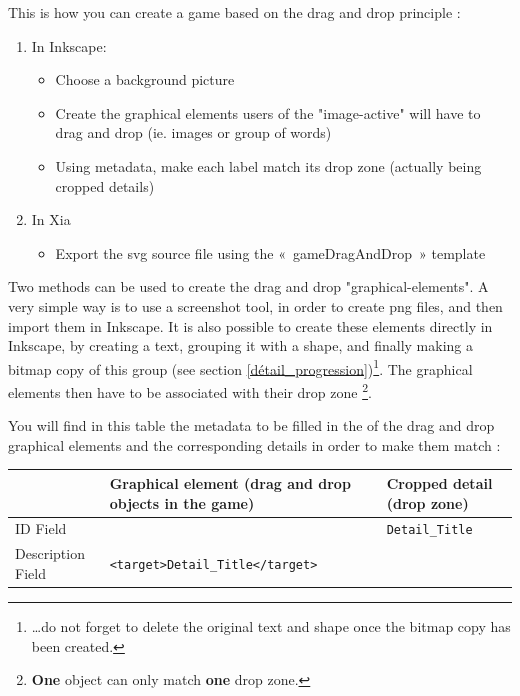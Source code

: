 
This is how you can create a game based on the drag and drop principle :
\begin{enumerate}
 \item In Inkscape:
\begin{itemize}
 \item Choose a background picture
 \item Create the graphical elements users of the "image-active" will have to drag and drop (ie. images or group of words)
 \item Using metadata, make each label match its drop zone (actually being cropped details)
\end{itemize}
 \item In Xia
 \begin{itemize}
  \item Export the svg source file using the «~gameDragAndDrop~» template
 \end{itemize}
\end{enumerate}

Two methods can be used to create the drag and drop "graphical-elements".
A very simple way is to use a screenshot tool, in order to create png files, and then import them in Inkscape.
It is also possible to create these elements directly in Inkscape, by creating a text, grouping it with a shape,
and finally making a bitmap copy of this group 
(see section \ref{détail_progression})\footnote{\ldots do not forget to delete
the original text and shape once the bitmap copy has been created.}.
The graphical elements then have to be associated with their drop zone \footnote{\textbf{One} object can only match \textbf{one} drop zone.}.

You will find in this table the metadata to be filled in the  
of the drag and drop graphical elements and the corresponding details in order to make them match :

\begin{center}
\begin{tabular}{|p{}|p{2.5in}|p{1.5in}|}
\hline
 & Graphical element (drag and drop objects in the game) & Cropped detail (drop zone)\\
\hline
ID Field & & \verb|Detail_Title|\\
\hline
Description Field & \verb|<target>Detail_Title</target>| & \\
\hline
\end{tabular}
\end{center}


